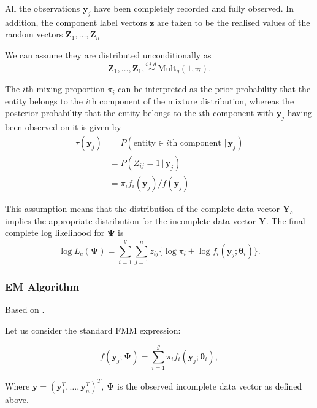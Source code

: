 \documentclass{article}\usepackage[]{graphicx}\usepackage[]{xcolor}
\theoremstyle{plain}
\theoremstyle{definition}
\theoremstyle{remark}
\newcommand{\boldY}{\mathbf{Y}}
\newcommand{\boldZ}{\mathbf{Z}}
\newcommand{\boldz}{\mathbf{z}}
\newcommand{\boldy}{\mathbf{y}}
\newcommand{\boldtheta}{\boldsymbol{\theta}}
\newcommand{\boldPsi}{\boldsymbol{\Psi}}
\begin{document}
All  the observations $\boldy_j$ have been completely recorded and fully observed. In addition, the component label vectors $\boldz$ are taken to be the realised values of the random vectors $\boldZ_1, \dots, \boldZ_n$

We can assume they are distributed unconditionally as
\begin{equation}
    \boldZ_1, \dots, \boldZ_1, \stackrel{i.i.d.}{\sim} \text{Mult}_g (1, \boldsymbol{\pi}).
\end{equation}

The $i$th mixing proportion $\pi_i$ can be interpreted as the prior probability that the entity belongs to the $i$th component of the mixture distribution, whereas the posterior probability that the entity belongs to the $i$th component with $\boldy_j$ having been observed on it is given by
\begin{align*}
    \tau(\boldy_j) &= P(\text{entity} \in i\text{th component } \vert \, \boldy_j ) \\
    &= P(Z_{ij} = 1 \, \vert \, \boldy_j) \\
    &= \pi_i f_i(\boldy_j) / f(\boldy_j)
\end{align*}

This assumption means that the distribution of the complete data vector $\boldY_c$ implies the appropriate distribution for the incomplete-data vector $\boldY$. The final complete log likelihood for $\boldPsi$ is
\begin{equation} \label{eq:llcomplete}
    \log L_c (\boldPsi) = \sum_{i=1}^g \sum_{j=1}^n z_{ij} \{ \log \pi_i + \log f_i (\boldy_j ; \boldtheta_i)\}.
\end{equation}


\subsubsection{EM Algorithm}
Based on \cite[Section 2.8]{FMMs_Book}.

Let us consider the standard FMM expression:

\begin{equation*}
    f(\boldy_j ; \boldPsi) = \sum_{i=1}^g \pi_i f_i (\boldy_j ; \boldtheta_i),
\end{equation*}

Where $\boldy = (\boldy_1^T, \dots, \boldy_n^T)^T$, $\boldPsi$ is the observed incomplete data vector as defined above.
\end{document}

